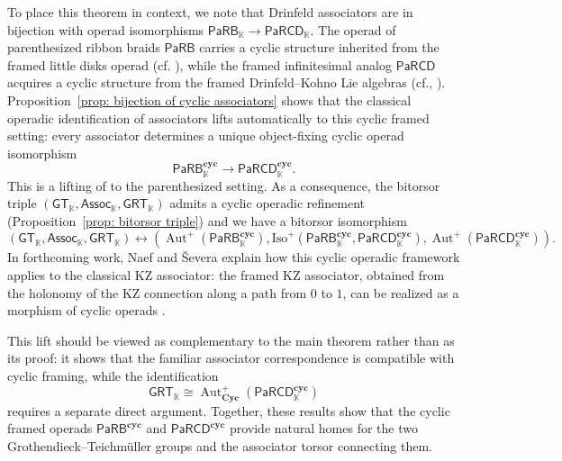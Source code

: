 \documentclass{amsart}
\newcommand{\kk}{\mathbb{K}}    %
\newcommand{\PaRB}{\mathsf{PaRB}}
\newcommand{\PaRCD}{\mathsf{PaRCD}}
\newcommand{\hPaRB}{{\PaRB}_{\kk}}
\newcommand{\hPaRCD}{{\PaRCD}_{\kk}}
\newcommand{\cyc}{\mathbf{cyc}}
\newcommand{\Cyc}{\mathbf{Cyc}}
\newcommand{\Aut}{\operatorname{Aut}}
\newcommand{\GT}{{\mathsf{GT}}}
\newcommand{\GRT}{{\mathsf{GRT}}}
\newcommand{\Assoc}{\mathsf{Assoc}}
\theoremstyle{definition}
\numberwithin{equation}{section}
\begin{document}
To place this theorem in context, we note that Drinfeld associators are in bijection with operad isomorphisms $ \hPaRB \to \hPaRCD $. The operad of parenthesized ribbon braids $\PaRB$ carries a cyclic structure inherited from the framed little disks operad (cf. \cite{campos2019configuration}), while the framed infinitesimal analog $\PaRCD$ acquires a cyclic structure from the framed Drinfeld--Kohno Lie algebras (cf.\cite{severa2009formality}, \cite[Section 5]{willwacher2024cyclic}). Proposition~\ref{prop: bijection of cyclic associators} shows that the classical operadic identification of associators lifts automatically to this cyclic framed setting: every associator determines a unique object-fixing cyclic operad isomorphism
\[
\hPaRB^{\cyc}\longrightarrow \hPaRCD^{\cyc}.
\]
This is a lifting of \cite[Lemma 3.2]{campos2019configuration} to the parenthesized setting. As a consequence, the bitorsor triple $( \GT_{\kk}, \Assoc_{\kk}, \GRT_{\kk} )$ admits a cyclic operadic refinement (Proposition~\ref{prop: bitorsor triple}) and we have a bitorsor isomorphism 
\[(\GT_{\kk},\Assoc_{\kk},\GRT_{\kk}) \leftrightarrow (\Aut^{+}(\hPaRB^{\cyc}), \text{Iso}^{+}(\hPaRB^{\cyc}, \hPaRCD^{\cyc}), \Aut^{+}(\hPaRCD^{\cyc})).\] In forthcoming work, Naef and Ševera explain how this cyclic operadic framework applies to the classical KZ associator: the framed KZ associator, obtained from the holonomy of the KZ connection along a path from $0$ to $1$, can be realized as a morphism of cyclic operads \cite{Drin,Severa26_cyclicKZ}.

This lift should be viewed as complementary to the main theorem rather than as its proof: it shows that the familiar associator correspondence is compatible with cyclic framing, while the identification
\[
\GRT_{\kk}\cong \Aut_{\Cyc}^{+}(\hPaRCD^{\cyc})
\]
requires a separate direct argument. Together, these results show that the cyclic framed operads $ \PaRB^{\cyc} $ and $ \PaRCD^{\cyc} $ provide natural homes for the two Grothendieck--Teichmüller groups and the associator torsor connecting them. 
\end{document}
